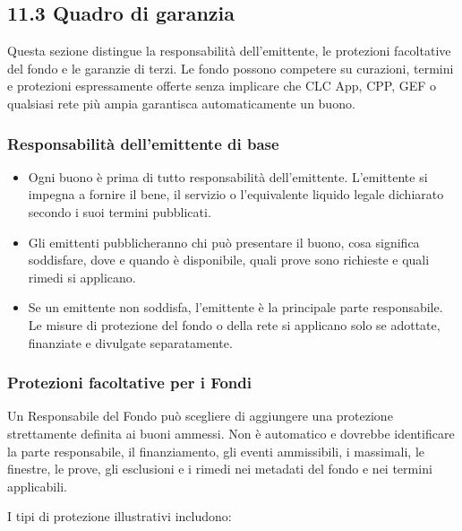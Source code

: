 \documentclass[11pt]{article}
\begin{document}
\subsection*{11.3 Quadro di garanzia}

Questa sezione distingue la responsabilità dell'emittente, le protezioni facoltative del fondo e le garanzie di terzi. Le fondo possono competere su curazioni, termini e protezioni espressamente offerte senza implicare che CLC App, CPP, GEF o qualsiasi rete più ampia garantisca automaticamente un buono.

\subsubsection*{Responsabilità dell'emittente di base}

\begin{itemize}[leftmargin=*]
\item Ogni buono è prima di tutto responsabilità dell'emittente. L'emittente si impegna a fornire il bene, il servizio o l'equivalente liquido legale dichiarato secondo i suoi termini pubblicati.
\item Gli emittenti pubblicheranno chi può presentare il buono, cosa significa soddisfare, dove e quando è disponibile, quali prove sono richieste e quali rimedi si applicano.
\item Se un emittente non soddisfa, l'emittente è la principale parte responsabile. Le misure di protezione del fondo o della rete si applicano solo se adottate, finanziate e divulgate separatamente.
\end{itemize}
\subsubsection*{Protezioni facoltative per i Fondi}

Un Responsabile del Fondo può scegliere di aggiungere una protezione strettamente definita ai buoni ammessi. Non è automatico e dovrebbe identificare la parte responsabile, il finanziamento, gli eventi ammissibili, i massimali, le finestre, le prove, gli esclusioni e i rimedi nei metadati del fondo e nei termini applicabili.

I tipi di protezione illustrativi includono:
\end{document}
